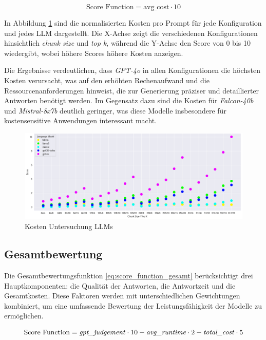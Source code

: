 \begin{equation}
    \mbox{Score Function} = \mbox{avg\_cost} \cdot 10
    \label{eq:score_function_kosten}
\end{equation}

In Abbildung \ref{fig:kosten} sind die normalisierten Kosten pro Prompt für jede Konfiguration und jedes \ac{LLM} dargestellt. 
Die X-Achse zeigt die verschiedenen Konfigurationen hinsichtlich \textit{chunk size} und \textit{top k}, während die Y-Achse den Score von 0 bis 10 wiedergibt, wobei höhere Scores höhere Kosten anzeigen.

Die Ergebnisse verdeutlichen, dass \textit{GPT-4o} in allen Konfigurationen die höchsten Kosten verursacht, was auf den erhöhten Rechenaufwand und die Ressourcenanforderungen hinweist, 
die zur Generierung präziser und detaillierter Antworten benötigt werden. Im Gegensatz dazu sind die Kosten für \textit{Falcon-40b} und \textit{Mistral-8x7b} deutlich geringer, 
was diese Modelle insbesondere für kostensensitive Anwendungen interessant macht.



\begin{figure}[H]
    \centering
    \includegraphics[width=1\textwidth]{img/kosten.png}
    \caption{Kosten Untersuchung \acp{LLM}}
    \label{fig:kosten}
\end{figure}

\subsection{Gesamtbewertung}

Die Gesamtbewertungsfunktion \ref{eq:score_function_gesamt} berücksichtigt drei Hauptkomponenten: die Qualität der Antworten, die Antwortzeit und die Gesamtkosten. 
Diese Faktoren werden mit unterschiedlichen Gewichtungen kombiniert, um eine umfassende Bewertung der Leistungsfähigkeit der Modelle zu ermöglichen.

\begin{equation}
    \mbox{Score Function} = \mbox{\textit{gpt\_judgement}} \cdot 10 - \mbox{\textit{avg\_runtime}} \cdot 2 - \mbox{\textit{total\_cost}} \cdot 5
    \label{eq:score_function_gesamt}
\end{equation}

